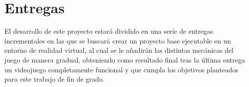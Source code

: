 



\section{Entregas}
\label{sec:planentregas}

El desarrollo de este proyecto estará dividido en una serie de entregas incrementales en las que se buscará crear un proyecto base ejecutable en un entorno de realidad virtual, al cual se le añadirán las distintas mecánicas del juego de manera gradual, obteniendo como resultado final tras la última entrega un videojuego completamente funcional y que cumpla los objetivos planteados para este trabajo de fin de grado.



